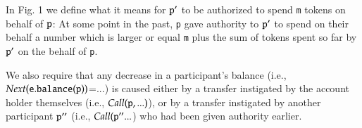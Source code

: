 \documentclass[10pt]{article}
\newcommand{\prg}[1]{{\mbox{{{\tt #1}}}}}%
\newcommand{\RoSpec}{${\cal C}hainmail$}
\begin{document}
\begin{multicols}{2}
  
 In Fig. 1 
 we  define %
 what it means for $\prg{p}'$ to be authorized to spend \prg{m} tokens on behalf of $\prg{p}$: At some point in the
past,  \prg{p} gave authority to $\prg{p}'$  to spend on their behalf  a number %
which is larger or equal   \prg{m} 
plus the sum of  tokens 
spent so far by $\prg{p}' $ on the behalf of \prg{p}. %
%

We also require that %
any decrease in  a participant's balance  %
 (i.e.,  $Next(\prg{e}.\prg{balance}(\prg{p}))$=$...$)  
is caused either by a transfer instigated by the account holder themselves (i.e., $Call(\prg{p},...)$), or by
a transfer instigated by another participant $\prg{p}''$  (i.e., $Call(\prg{p}''...$) who   had   been given authority earlier.
 
%
%
%


\end{multicols}
\end{document}

